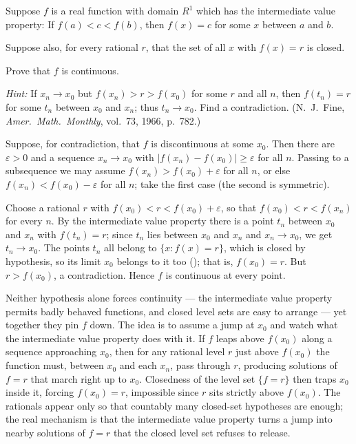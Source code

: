\documentclass[main.tex]{subfiles}
\begin{document}
Suppose $f$ is a real function with domain $R^{1}$ which has the intermediate value property: If $f(a) < c < f(b)$, then $f(x) = c$ for some $x$ between $a$ and $b$.

Suppose also, for every rational $r$, that the set of all $x$ with $f(x) = r$ is closed.

Prove that $f$ is continuous.

\textit{Hint:} If $x_{n} \to x_{0}$ but $f(x_{n}) > r > f(x_{0})$ for some $r$ and all $n$, then $f(t_{n}) = r$ for some $t_{n}$ between $x_{0}$ and $x_{n}$; thus $t_{n} \to x_{0}$. Find a contradiction. (N.\ J.\ Fine, \textit{Amer.\ Math.\ Monthly}, vol.\ 73, 1966, p.\ 782.)
\begin{SolutionBlue}
Suppose, for contradiction, that $f$ is discontinuous at some $x_{0}$. Then there are $\varepsilon > 0$ and a sequence $x_{n} \to x_{0}$ with $|f(x_{n}) - f(x_{0})| \ge \varepsilon$ for all $n$. Passing to a subsequence we may assume $f(x_{n}) > f(x_{0}) + \varepsilon$ for all $n$, or else $f(x_{n}) < f(x_{0}) - \varepsilon$ for all $n$; take the first case (the second is symmetric).

Choose a rational $r$ with $f(x_{0}) < r < f(x_{0}) + \varepsilon$, so that $f(x_{0}) < r < f(x_{n})$ for every $n$. By the intermediate value property there is a point $t_{n}$ between $x_{0}$ and $x_{n}$ with $f(t_{n}) = r$; since $t_{n}$ lies between $x_{0}$ and $x_{n}$ and $x_{n} \to x_{0}$, we get $t_{n} \to x_{0}$. The points $t_{n}$ all belong to $\{x : f(x) = r\}$, which is closed by hypothesis, so its limit $x_{0}$ belongs to it too (); that is, $f(x_{0}) = r$. But $r > f(x_{0})$, a contradiction. Hence $f$ is continuous at every point.
\end{SolutionBlue}
\begin{Reflection}
Neither hypothesis alone forces continuity --- the intermediate value property permits badly behaved functions, and closed level sets are easy to arrange --- yet together they pin $f$ down. The idea is to assume a jump at $x_{0}$ and watch what the intermediate value property does with it. If $f$ leaps above $f(x_{0})$ along a sequence approaching $x_{0}$, then for any rational level $r$ just above $f(x_{0})$ the function must, between $x_{0}$ and each $x_{n}$, pass through $r$, producing solutions of $f = r$ that march right up to $x_{0}$. Closedness of the level set $\{f = r\}$ then traps $x_{0}$ inside it, forcing $f(x_{0}) = r$, impossible since $r$ sits strictly above $f(x_{0})$. The rationals appear only so that countably many closed-set hypotheses are enough; the real mechanism is that the intermediate value property turns a jump into nearby solutions of $f = r$ that the closed level set refuses to release.
\end{Reflection}
\end{document}
